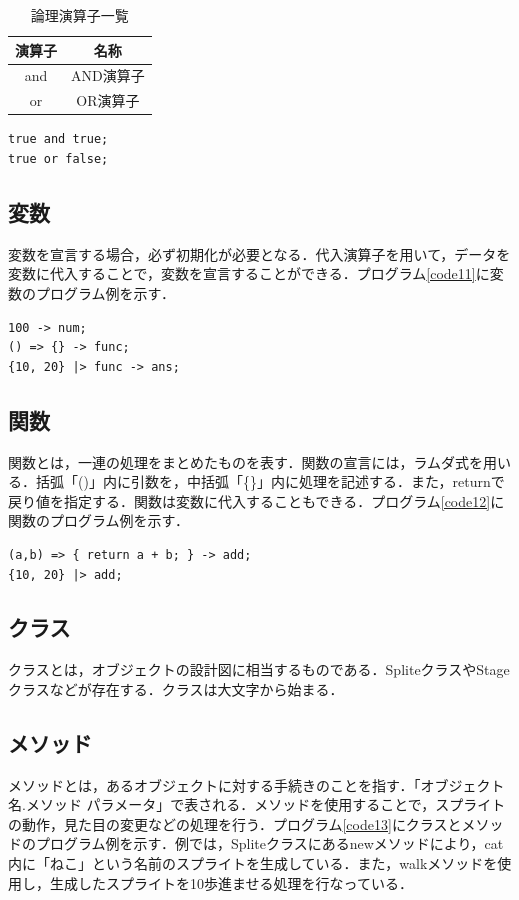 \documentclass[10pt,a4j]{ltjsarticle}
\begin{document}
\begin{table}[H]
 \caption{論理演算子一覧}
 \label{tab:table03}
 \centering
  \begin{tabular}{cc}
   \hline
   演算子 & 名称 \\
   \hline \hline
   and & AND演算子 \\
   or & OR演算子 \\
   \hline
  \end{tabular}
\end{table}

\begin{lstlisting}[caption=論理演算子のプログラム例, label=code10]
true and true;
true or false;
\end{lstlisting}

\subsection{変数}
変数を宣言する場合，必ず初期化が必要となる．代入演算子を用いて，データを変数に代入することで，変数を宣言することができる．プログラム\ref{code11}に変数のプログラム例を示す．

\begin{lstlisting}[caption=変数のプログラム例, label=code11]
100 -> num;
() => {} -> func;
{10, 20} |> func -> ans; 
\end{lstlisting}

\subsection{関数}
関数とは，一連の処理をまとめたものを表す．関数の宣言には，ラムダ式を用いる．括弧「()」内に引数を，中括弧「\{\}」内に処理を記述する．また，returnで戻り値を指定する．関数は変数に代入することもできる．プログラム\ref{code12}に関数のプログラム例を示す．

\begin{lstlisting}[caption=関数のプログラム例, label=code12]
(a,b) => { return a + b; } -> add;
{10, 20} |> add;
\end{lstlisting}

\subsection{クラス}
クラスとは，オブジェクトの設計図に相当するものである．SpliteクラスやStageクラスなどが存在する．クラスは大文字から始まる．

\subsection{メソッド}
メソッドとは，あるオブジェクトに対する手続きのことを指す．「オブジェクト名.メソッド パラメータ」で表される．メソッドを使用することで，スプライトの動作，見た目の変更などの処理を行う．プログラム\ref{code13}にクラスとメソッドのプログラム例を示す．例では，Spliteクラスにあるnewメソッドにより，cat内に「ねこ」という名前のスプライトを生成している．また，walkメソッドを使用し，生成したスプライトを10歩進ませる処理を行なっている．
\end{document}
